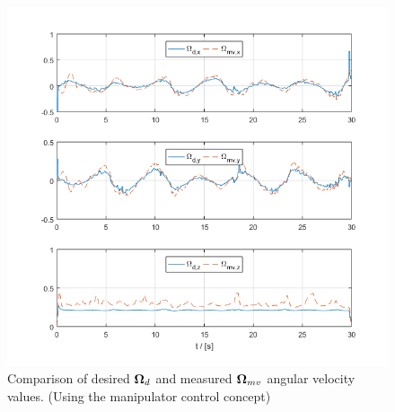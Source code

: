 \begin{figure}[h!]
	\centering
	\includegraphics[width=\columnwidth]{./pictures/manip_traj_omega.png}
	\caption{Comparison of desired $\boldsymbol{\Omega}_d$ and measured $\boldsymbol{\Omega}_{mv}$ angular velocity values. (Using the manipulator control concept)}
	\label{fig:manip_omega}
\end{figure}
